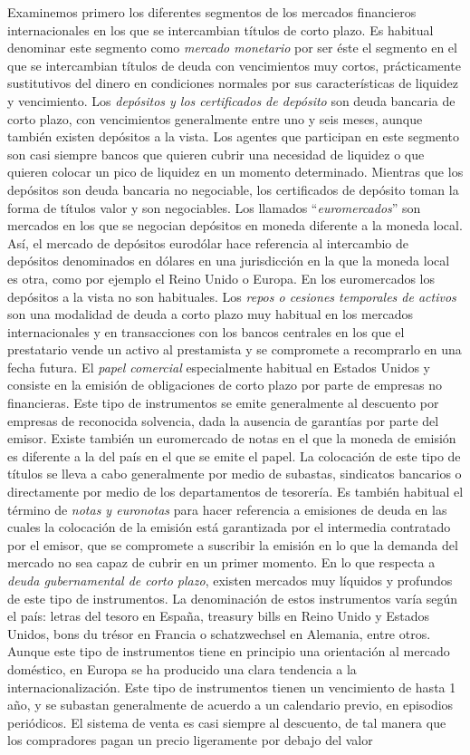 \documentclass{nuevotema}
\begin{document}
Examinemos primero los diferentes segmentos de los mercados financieros internacionales en los que se intercambian títulos de corto plazo. Es habitual denominar este segmento como \textit{mercado monetario} por ser éste el segmento en el que se intercambian títulos de deuda con vencimientos muy cortos, prácticamente sustitutivos del dinero en condiciones normales por sus características de liquidez y vencimiento. Los \textit{depósitos y los certificados de depósito} son deuda bancaria de corto plazo, con vencimientos generalmente entre uno y seis meses, aunque también existen depósitos a la vista. Los agentes que participan en este segmento son casi siempre bancos que quieren cubrir una necesidad de liquidez o que quieren colocar un pico de liquidez en un momento determinado. Mientras que los depósitos son deuda bancaria no negociable, los certificados de depósito toman la forma de títulos valor y son negociables. Los llamados ``\textit{euromercados}'' son mercados en los que se negocian depósitos en moneda diferente a la moneda local. Así, el mercado de depósitos eurodólar hace referencia al intercambio de depósitos denominados en dólares en una jurisdicción en la que la moneda local es otra, como por ejemplo el Reino Unido o Europa. En los euromercados los depósitos a la vista no son habituales. Los \textit{repos o cesiones temporales de activos} son una modalidad de deuda a corto plazo muy habitual en los mercados internacionales y en transacciones con los bancos centrales en los que el prestatario vende un activo al prestamista y se compromete a recomprarlo en una fecha futura. El \textit{papel comercial} especialmente habitual en Estados Unidos y consiste en la emisión de obligaciones de corto plazo por parte de empresas no financieras. Este tipo de instrumentos se emite generalmente al descuento por empresas de reconocida solvencia, dada la ausencia de garantías por parte del emisor. Existe también un euromercado de notas en el que la moneda de emisión es diferente a la del país en el que se emite el papel. La colocación de este tipo de títulos se lleva a cabo generalmente por medio de subastas, sindicatos bancarios o directamente por medio de los departamentos de tesorería. Es también habitual el término de \textit{notas y euronotas} para hacer referencia a emisiones de deuda en las cuales la colocación de la emisión está garantizada por el intermedia contratado por el emisor, que se compromete a suscribir la emisión en lo que la demanda del mercado no sea capaz de cubrir en un primer momento. En lo que respecta a \textit{deuda gubernamental de corto plazo}, existen mercados muy líquidos y profundos de este tipo de instrumentos. La denominación de estos instrumentos varía según el país: letras del tesoro en España, treasury bills en Reino Unido y Estados Unidos, bons du trésor en Francia o schatzwechsel en Alemania, entre otros. Aunque este tipo de instrumentos tiene en principio una orientación al mercado doméstico, en Europa se ha producido una clara tendencia a la internacionalización. Este tipo de instrumentos tienen un vencimiento de hasta 1 año, y se subastan generalmente de acuerdo a un calendario previo, en episodios periódicos. El sistema de venta es casi siempre al descuento, de tal manera que los compradores pagan un precio ligeramente por debajo del valor 
\end{document}
